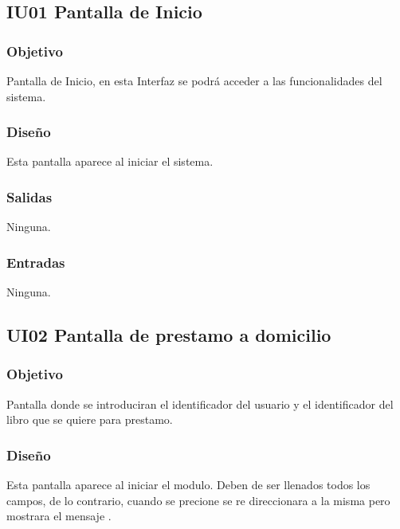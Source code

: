 \newpage
\subsection{IU01 Pantalla de Inicio}

\subsubsection{Objetivo}
	Pantalla de Inicio, en esta Interfaz se podrá acceder a las funcionalidades del sistema.  

\subsubsection{Diseño}
	Esta pantalla aparece al iniciar el sistema.  


\subsubsection{Salidas}
	\begin{Citemize}
		\item Ninguna. 
	\end{Citemize}
	
\subsubsection{Entradas}
	\begin{Citemize}
		\item Ninguna.
	\end{Citemize}







\newpage
\subsection{UI02 Pantalla de prestamo a domicilio}

\subsubsection{Objetivo}
	Pantalla donde se introduciran el identificador del usuario y el identificador del libro que se quiere para prestamo.

\subsubsection{Diseño}
	Esta pantalla aparece al iniciar el modulo. Deben de ser llenados todos los campos, de lo contrario, cuando se precione   se re direccionara a la misma pero mostrara el mensaje .

